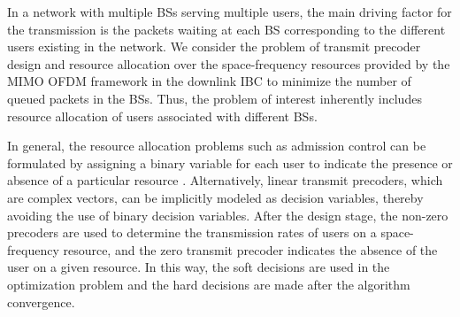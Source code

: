 In a network with multiple \acp{BS} serving multiple users, the main driving factor for the transmission is the packets waiting at each \ac{BS} corresponding to the different users existing in the network. We consider the problem of transmit precoder design and resource allocation over the space-frequency resources provided by the \ac{MIMO} \ac{OFDM} framework in the downlink \ac{IBC} to minimize the number of queued packets in the \acp{BS}. Thus, the problem of interest inherently includes resource allocation of users associated with different \acp{BS}.

In general, the resource allocation problems such as admission control can be formulated by assigning a binary variable for each user to indicate the presence or absence of a particular resource \cite{admission_control}. Alternatively, linear transmit precoders, which are complex vectors, can be implicitly modeled as decision variables, thereby avoiding the use of binary decision variables. After the design stage, the non-zero precoders are used to determine the transmission rates of users on a space-frequency resource, and the zero transmit precoder indicates the absence of the user on a given resource. In this way, the soft decisions are used in the optimization problem and the hard decisions are made after the algorithm convergence.

